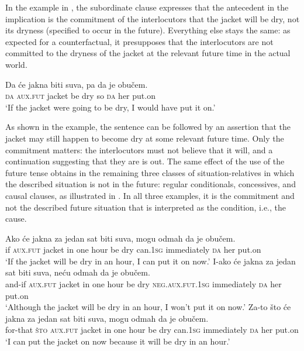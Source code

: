 \documentclass[output=paper]{langscibook}
\begin{document}
In the example in , the subordinate clause expresses that the antecedent in the implication is the commitment of the interlocutors that the jacket will be dry, not its dryness (specified to occur in the future). Everything else stays the same: as expected for a counterfactual, it presupposes that the interlocutors are not committed to the dryness of the jacket at the relevant future time in the actual world.

\ea\label{ex:Unreal-subj-verb}
\gll Da će jakna biti suva, pa da je obučem.\\
\textsc{da} \textsc{aux.fut} jacket be dry so \textsc{da} her put.on\\
\glt `If the jacket were going to be dry, I would have put it on.'
\z\z

\noindent As shown in the example, the sentence can be followed by an assertion that the jacket may still happen to become dry at some relevant future time. Only the commitment matters: the interlocutors must not believe that it will, and a continuation suggesting that they are is out.
The same effect of the use of the future tense obtains in the remaining three classes of situation-relatives in which the described situation is not in the future: regular conditionals, concessives, and causal clauses, as illustrated in . In all three examples, it is the commitment and not the described future situation that is interpreted as the condition, i.e., the cause.

\ea\label{ex:Future-verb}
\ea \gll Ako će jakna za jedan sat biti suva, mogu odmah da je obučem.\\
    if \textsc{aux.fut} jacket in one hour be dry can.\textsc{1sg} immediately \textsc{da} her put.on\\
    \glt `If the jacket will be dry in an hour, I can put it on now.'\label{ex:Future-verb-a}
\ex \gll I-ako će jakna za jedan sat biti suva, neću odmah da je obučem.\\
    and-if \textsc{aux.fut} jacket in one hour be dry \textsc{neg.aux.fut.1sg} immediately \textsc{da} her put.on\\
    \glt `Although the jacket will be dry in an hour, I won't put it on now.'\label{ex:Future-verb-b}
\ex \gll Za-to što će jakna za jedan sat biti suva, mogu odmah da je obučem.\\
    for-that \textsc{što} \textsc{aux.fut} jacket in one hour be dry can.\textsc{1sg} immediately \textsc{da} her put.on\\
    \glt `I can put the jacket on now because it will be dry in an hour.'\label{ex:Future-verb-c}
\z\z
\end{document}
